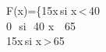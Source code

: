 F(x)=\left\{15x\,\;\;\;\mbox{si}\,\,x\,<\,40\\
0 \,\,\;\;\;\;\;\mbox{si} \,\,40\,\leq \,x\, \leq\, 65\\
15x\,\;\;\;\mbox{si}\,\,x\,>\,65